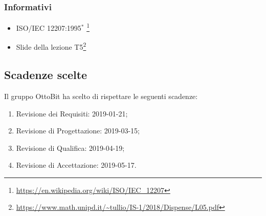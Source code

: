 	\subsubsection{Informativi}
		\begin{itemize}
			\item ISO/IEC 12207:1995$^*$ \footnote{\url{https://en.wikipedia.org/wiki/ISO/IEC_12207}}
			\item Slide della lezione T5\footnote{\url{https://www.math.unipd.it/~tullio/IS-1/2018/Dispense/L05.pdf}}
		\end{itemize}

\subsection{Scadenze scelte}
	Il gruppo OttoBit ha scelto di rispettare le seguenti scadenze:
	\begin{enumerate}
		\item Revisione dei Requisiti: 2019-01-21;
		\item Revisione di Progettazione: 2019-03-15;
		\item Revisione di Qualifica: 2019-04-19;
		\item Revisione di Accettazione: 2019-05-17.
	\end{enumerate}